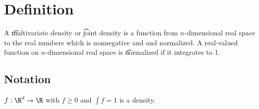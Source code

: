 

\section*{Definition}

A \t{multivariate density} or \t{joint density} is a function from $n$-dimensional real space to the real numbers which is nonnegative and and normalized.
A real-valued function on $n$-dimensional real space is \t{normalized} if it integrates to 1.

\subsection*{Notation}

$f: \R ^d \to \R $ with $f \geq 0$ and $\int f = 1$ is a density.

\blankpage